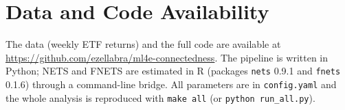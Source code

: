 \section{Data and Code Availability}
The data (weekly ETF returns) and the full code are available at \url{https://github.com/ezellabra/ml4e-connectedness}. The pipeline is written in Python; NETS and FNETS are estimated in R (packages \texttt{nets} 0.9.1 and \texttt{fnets} 0.1.6) through a command-line bridge. All parameters are in \texttt{config.yaml} and the whole analysis is reproduced with \texttt{make all} (or \texttt{python run\_all.py}).
